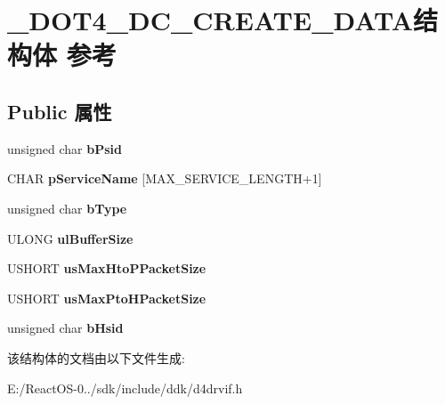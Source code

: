 \hypertarget{struct___d_o_t4___d_c___c_r_e_a_t_e___d_a_t_a}{}\section{\+\_\+\+D\+O\+T4\+\_\+\+D\+C\+\_\+\+C\+R\+E\+A\+T\+E\+\_\+\+D\+A\+T\+A结构体 参考}
\label{struct___d_o_t4___d_c___c_r_e_a_t_e___d_a_t_a}
\subsection*{Public 属性}
\begin{DoxyCompactItemize}
\item 
\mbox{\label{struct___d_o_t4___d_c___c_r_e_a_t_e___d_a_t_a_aa1c93ecc9e3310359a44de60fd827f1c}} 
unsigned char {\bfseries b\+Psid}
\item 
\mbox{\label{struct___d_o_t4___d_c___c_r_e_a_t_e___d_a_t_a_ad7313b99fff624a4d3437cb12968c220}} 
C\+H\+AR {\bfseries p\+Service\+Name} \mbox{[}M\+A\+X\+\_\+\+S\+E\+R\+V\+I\+C\+E\+\_\+\+L\+E\+N\+G\+TH+1\mbox{]}
\item 
\mbox{\label{struct___d_o_t4___d_c___c_r_e_a_t_e___d_a_t_a_a03be8af2ba94f1f31fd25b5e192bf1e5}} 
unsigned char {\bfseries b\+Type}
\item 
\mbox{\label{struct___d_o_t4___d_c___c_r_e_a_t_e___d_a_t_a_a9838ed93c7e62b0c51bd62f9f8a56586}} 
U\+L\+O\+NG {\bfseries ul\+Buffer\+Size}
\item 
\mbox{\label{struct___d_o_t4___d_c___c_r_e_a_t_e___d_a_t_a_a95c1f9498d30bca313c5c1329cb58d01}} 
U\+S\+H\+O\+RT {\bfseries us\+Max\+Hto\+P\+Packet\+Size}
\item 
\mbox{\label{struct___d_o_t4___d_c___c_r_e_a_t_e___d_a_t_a_aad095122b688b913863bec50b526324e}} 
U\+S\+H\+O\+RT {\bfseries us\+Max\+Pto\+H\+Packet\+Size}
\item 
\mbox{\label{struct___d_o_t4___d_c___c_r_e_a_t_e___d_a_t_a_aeb3620a1f70692b785dc6dd8a23fb560}} 
unsigned char {\bfseries b\+Hsid}
\end{DoxyCompactItemize}


该结构体的文档由以下文件生成\+:\begin{DoxyCompactItemize}
\item 
E\+:/\+React\+O\+S-\/0../sdk/include/ddk/d4drvif.\+h\end{DoxyCompactItemize}
